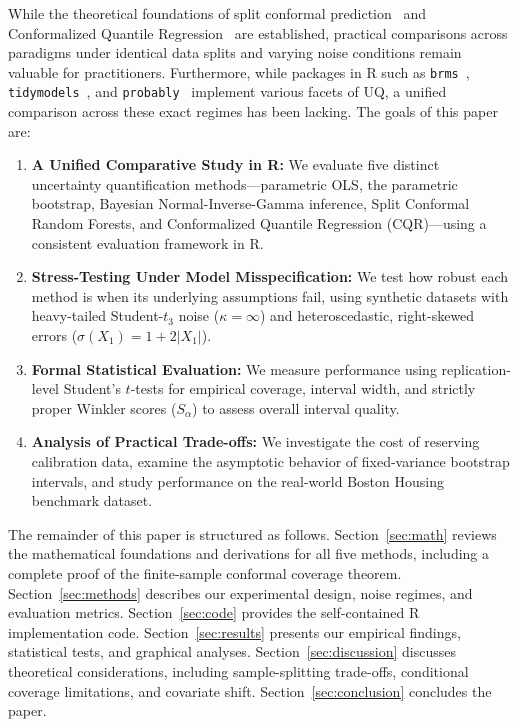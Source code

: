 \documentclass[journal]{IEEEtran}
\begin{document}
While the theoretical foundations of split conformal prediction~\cite{papadopoulos2002, lei2018} and Conformalized Quantile Regression~\cite{romano2019} are established, practical comparisons across paradigms under identical data splits and varying noise conditions remain valuable for practitioners. Furthermore, while packages in R such as \texttt{brms}~\cite{burkner2017}, \texttt{tidymodels}~\cite{kuhn2020}, and \texttt{probably}~\cite{kuhn2025} implement various facets of UQ, a unified comparison across these exact regimes has been lacking. The goals of this paper are:
\begin{enumerate}
    \item \textbf{A Unified Comparative Study in R:} We evaluate five distinct uncertainty quantification methods---parametric OLS, the parametric bootstrap, Bayesian Normal-Inverse-Gamma inference, Split Conformal Random Forests, and Conformalized Quantile Regression (CQR)---using a consistent evaluation framework in R.
    \item \textbf{Stress-Testing Under Model Misspecification:} We test how robust each method is when its underlying assumptions fail, using synthetic datasets with heavy-tailed Student-$t_3$ noise ($\kappa = \infty$) and heteroscedastic, right-skewed errors ($\sigma(X_1) = 1 + 2|X_1|$).
    \item \textbf{Formal Statistical Evaluation:} We measure performance using replication-level Student's $t$-tests for empirical coverage, interval width, and strictly proper Winkler scores ($S_\alpha$) to assess overall interval quality.
    \item \textbf{Analysis of Practical Trade-offs:} We investigate the cost of reserving calibration data, examine the asymptotic behavior of fixed-variance bootstrap intervals, and study performance on the real-world Boston Housing benchmark dataset.
\end{enumerate}

The remainder of this paper is structured as follows. Section~\ref{sec:math} reviews the mathematical foundations and derivations for all five methods, including a complete proof of the finite-sample conformal coverage theorem. Section~\ref{sec:methods} describes our experimental design, noise regimes, and evaluation metrics. Section~\ref{sec:code} provides the self-contained R implementation code. Section~\ref{sec:results} presents our empirical findings, statistical tests, and graphical analyses. Section~\ref{sec:discussion} discusses theoretical considerations, including sample-splitting trade-offs, conditional coverage limitations, and covariate shift. Section~\ref{sec:conclusion} concludes the paper.
\end{document}
